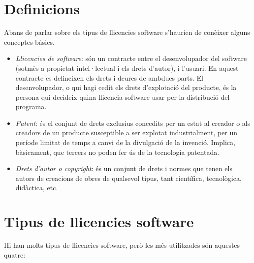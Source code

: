 \section{Definicions}
Abans de parlar sobre els tipus de llicencies software s'haurien 
de conèixer alguns conceptes bàsics.

\begin {itemize}
	\item \emph{Llicencies de software}: són un contracte entre el desenvolupador 
	del software (sotmès a propietat intel·lectual i els drets d'autor), i l'usuari. 
	En aquest contracte es defineixen els drets i deures de ambdues parts. El 
	desenvolupador, o qui hagi cedit els drets d'explotació del producte, és 
	la persona qui decideix quina llicencia software usar per la distribució del 
	programa.
	\item \emph{Patent}: és el conjunt de drets exclusius concedits per un estat al 
	creador o als creadors de un producte susceptible a ser explotat industrialment, 
	per un període limitat de temps a canvi de la divulgació de la invenció. Implica,
	bàsicament, que tercers no poden fer ús de la tecnologia patentada. \cite {definicions}
	\item \emph{Drets d'autor o \textit{copyright}}: és un conjunt de drets i normes \cite {copyright}
	que tenen els autors de creacions de obres de qualsevol tipus, tant científica, 
	tecnològica, didàctica, etc.
\end {itemize}

\section{Tipus de llicencies software}
Hi han molts tipus de llicencies software, però les més utilitzades són aquestes quatre:

